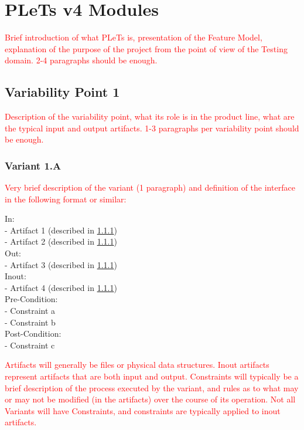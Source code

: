 \chapter{PLeTs v4 Modules}
\label{ch:modules}

\textcolor{red}{Brief introduction of what PLeTs is, presentation of the Feature Model, explanation of the purpose of the project from the point of view of the Testing domain. 2-4 paragraphs should be enough.}


\section{Variability Point 1}

\textcolor{red}{Description of the variability point, what its role is in the product line, what are the typical input and output artifacts. 1-3 paragraphs per variability point should be enough.}


\subsection{Variant 1.A}

\textcolor{red}{Very brief description of the variant (1 paragraph) and definition of the interface in the following format or similar:}

\begin{listing}
In:
\\  - Artifact 1 (described in \ref{})
\\  - Artifact 2 (described in \ref{})
\\Out:
\\  - Artifact 3 (described in \ref{})
\\Inout:
\\  - Artifact 4 (described in \ref{})
\\Pre-Condition:
\\  - Constraint a
\\  - Constraint b
\\Post-Condition:
\\  - Constraint c
\caption{Variant 1.A Interface}
\end{listing}

\textcolor{red}{Artifacts will generally be files or physical data structures. Inout artifacts represent artifacts that are both input and output. Constraints will typically be a brief description of the process executed by the variant, and rules as to what may or may not be modified (in the artifacts) over the course of its operation. Not all Variants will have Constraints, and constraints are typically applied to inout artifacts.}


